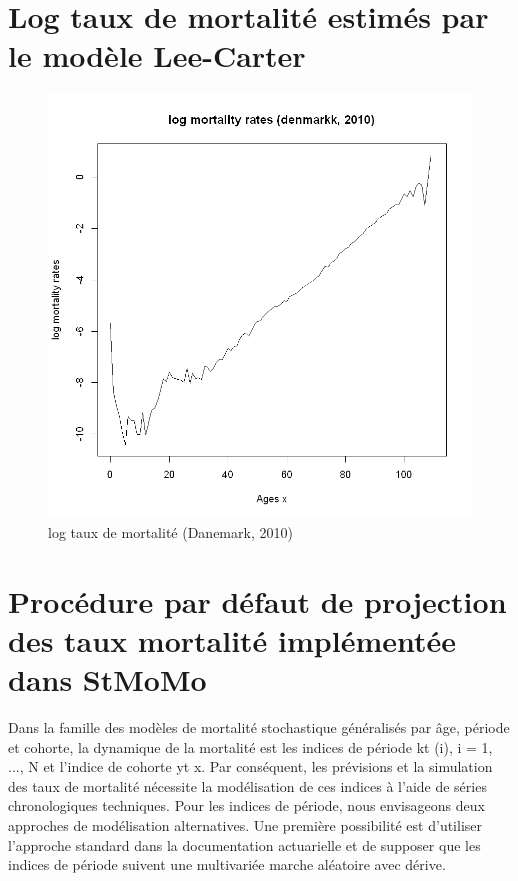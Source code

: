 \section{Log taux de mortalité estimés par le modèle Lee-Carter} 
\begin{figure}[!htb]
 \caption{log taux de mortalité (Danemark, 2010)}
    \centering
    \includegraphics[scale =0.6]{output_20_0.png}
\end{figure}

\section{Procédure par défaut de projection des taux mortalité implémentée dans StMoMo}
Dans la famille des modèles de mortalité stochastique généralisés par âge, période et cohorte, la dynamique de la mortalité est les indices de période kt (i), i = 1, ..., N et l’indice de cohorte yt x. Par conséquent, les prévisions et la simulation des taux de mortalité nécessite la modélisation de ces indices à l’aide de séries chronologiques techniques. Pour les indices de période, nous envisageons deux approches de modélisation alternatives. Une première possibilité est d’utiliser l’approche standard dans la documentation actuarielle et de supposer que les indices de période suivent une multivariée marche aléatoire avec dérive.

